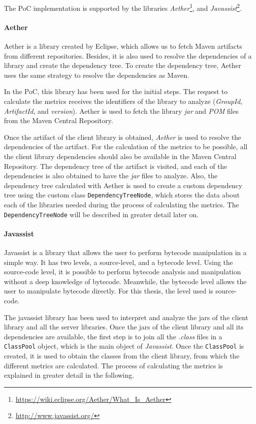 The PoC implementation is supported by the libraries  \textit{Aether}\footnote{\url{https://wiki.eclipse.org/Aether/What_Is_Aether}}, and \textit{Javassist}\footnote{\url{http://www.javassist.org/}}.

\paragraph{Aether}
Aether is a library created by Eclipse, which allows us to fetch Maven artifacts from different repositories. Besides, it is also used to resolve the dependencies of a library and create the dependency tree. To create the dependency tree, Aether uses the same strategy to resolve the dependencies as Maven.

In the PoC, this library has been used for the initial steps. The request to calculate the metrics receives the identifiers of the library to analyze (\textit{GroupId}, \textit{ArtifactId}, and \textit{version}). Aether is used to fetch the library \textit{jar} and \textit{POM} files from the Maven Central Repository.

Once the artifact of the client library is obtained, \textit{Aether} is used to resolve the dependencies of the artifact. For the calculation of the metrics to be possible, all the client library dependencies should also be available in the Maven Central Repository. The dependency tree of the artifact is visited, and each of the dependencies is also obtained to have the \textit{jar} files to analyze. Also, the dependency tree calculated with Aether is used to create a custom dependency tree using the custom class \texttt{DependencyTreeNode}, which stores the data about each of the libraries needed during the process of calculating the metrics. The \texttt{DependencyTreeNode} will be described in greater detail later on.

\paragraph{Javassist}
Javassist is a library that allows the user to perform bytecode manipulation in a simple way. It has two levels, a source-level, and a bytecode level. Using the source-code level, it is possible to perform bytecode analysis and manipulation without a deep knowledge of bytecode. Meanwhile, the bytecode level allows the user to manipulate bytecode directly.
For this thesis, the level used is source-code.

The javassist library has been used to interpret and analyze the jars of the client library and all the server libraries. Once the jars of the client library and all its dependencies are available, the first step is to join all the \textit{.class} files in a \texttt{ClassPool} object, which is the main object of \textit{Javassist}. Once the \texttt{ClassPool} is created, it is used to obtain the classes from the client library, from which the different metrics are calculated. The process of calculating the metrics is explained in greater detail in the following.

